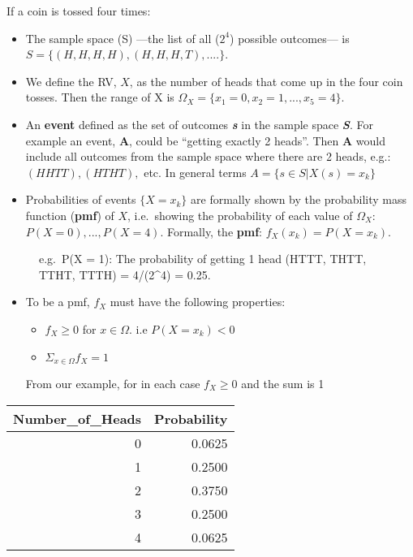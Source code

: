 \documentclass[
  letterpaper,
  DIV=11,
  numbers=noendperiod]{scrreprt}
\begin{document}
If a coin is tossed four times:

\begin{itemize}
\item
  The sample space (S) ---the list of all (\(2^4\)) possible outcomes---
  is \(S = \{(H, H, H, H), (H, H, H, T), ....\}\).
\item
  We define the RV, \(X\), as the number of heads that come up in the
  four coin tosses. Then the range of X is
  \(\Omega_X = \{x_1 = 0, x_2 = 1,..., x_5= 4\}\).
\item
  An \textbf{event} defined as the set of outcomes \textbf{\emph{s}} in
  the sample space \textbf{\emph{S}}. For example an event, \textbf{A},
  could be ``getting exactly 2 heads''. Then \textbf{A} would include
  all outcomes from the sample space where there are 2 heads, e.g.:
  \((HHTT), (HTHT),\) etc. In general terms \(A=\{s∈S|X(s)=x_k\}\)
\item
  Probabilities of events \(\{X=x_k\}\) are formally shown by the
  probability mass function (\textbf{pmf}) of \(X\), i.e.~showing the
  probability of each value of \(\Omega_X\): \(P(X=0), ..., P(X=4)\).
  Formally, the \textbf{pmf}: \(f_X(x_k) = P(X=x_k)\).
\end{itemize}

\begin{figure}


\caption{\label{fig-coin\_pmf1}e.g.~P(X = 1): The probability of getting
1 head (HTTT, THTT, TTHT, TTTH) = 4/(2\^{}4) = 0.25.}

\end{figure}%

\begin{itemize}
\item
  To be a pmf, \(f_X\) must have the following properties:

  \begin{itemize}
  \item
    \(f_X \ge 0\) for \(x \in \Omega\). i.e \(P(X =x_k) < 0\)
  \item
    \(\Sigma_{x \in \Omega} f_X = 1\)
  \end{itemize}

  From our example, for in each case \(f_X \ge 0\) and the sum is 1
\end{itemize}

\begin{tabular}{r|r}
\hline
Number\_of\_Heads & Probability\\
\hline
0 & 0.0625\\
\hline
1 & 0.2500\\
\hline
2 & 0.3750\\
\hline
3 & 0.2500\\
\hline
4 & 0.0625\\
\hline
\end{tabular}
\end{document}
